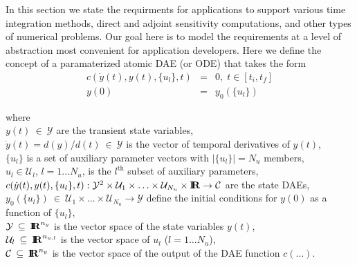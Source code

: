 \documentclass[pdf,ps2pdf,11pt]{SANDreport}
\begin{document}
In this section we state the requirments for applications to support various
time integration methods, direct and adjoint sensitivity computations, and
other types of numerical problems.  Our goal here is to model the requirements
at a level of abstraction most convenient for application developers.  Here we
define the concept of a paramaterized atomic DAE (or ODE) that takes the form
%
\begin{eqnarray}
c\left( \dot{y}(t), y(t), \{u_l\}, t \right) & = & 0,
\; t \in \left[ t_i, t_f \right] \label{rythmos:eqn:atomic:c} \\
y(0) & = & y_0(\{u_l\}) \label{rythmos:eqn:atomic:c:ic}
\end{eqnarray}
\begin{tabbing}
\hspace{4ex}where\hspace{1ex}\= \\
\>	$y(t) \:\in\:\mathcal{Y}$ are the transient state variables, \\
\>	$\dot{y}(t) = d(y)/d(t)\:\in\:\mathcal{Y}$ is the vector of temporal derivatives of $y(t)$, \\
\>	$\{u_l\}$ is a set of auxiliary parameter vectors with $|\{u_l\}| = N_u$ members, \\
\>	$u_l\in\mathcal{U}_l$, $l=1 {}\ldots N_u$, is the $l^{\mbox{th}}$ subset of auxiliary parameters, \\
\>	$c(\dot{y}(t), y(t), \{u_l\}, t) :
		\mathcal{Y}^2 \times \mathcal{U}_1 \times \ldots \times \mathcal{U}_{N_u} \times \mbox{\textbf{I}}\hspace{-0.6ex}\mbox{\textbf{R}}
		\rightarrow \mathcal{C}$ are the state DAEs, \\
\>	$y_0(\{u_l\}) \:\in\:\mathcal{U}_1 \times \ldots \times \mathcal{U}_{N_u} \rightarrow \mathcal{Y}$
		define the initial conditions for $y(0)$ as a function of $\{u_l\}$, \\
\>	$\mathcal{Y} \:\subseteq\:\mbox{\textbf{I}}\hspace{-0.6ex}\mbox{\textbf{R}}^{n_y}$ is the vector space of the state variables $y(t)$, \\
\>	$\mathcal{U}_l \:\subseteq\:\mbox{\textbf{I}}\hspace{-0.6ex}\mbox{\textbf{R}}^{n_{u,l}}$ is the vector space of $u_l$ ($l = 1 {}\ldots N_u$), \\
\>	$\mathcal{C} \:\subseteq\:\mbox{\textbf{I}}\hspace{-0.6ex}\mbox{\textbf{R}}^{n_y}$ is the vector space of the output of the DAE function $c(\ldots)$.
\end{tabbing}
\end{document}
